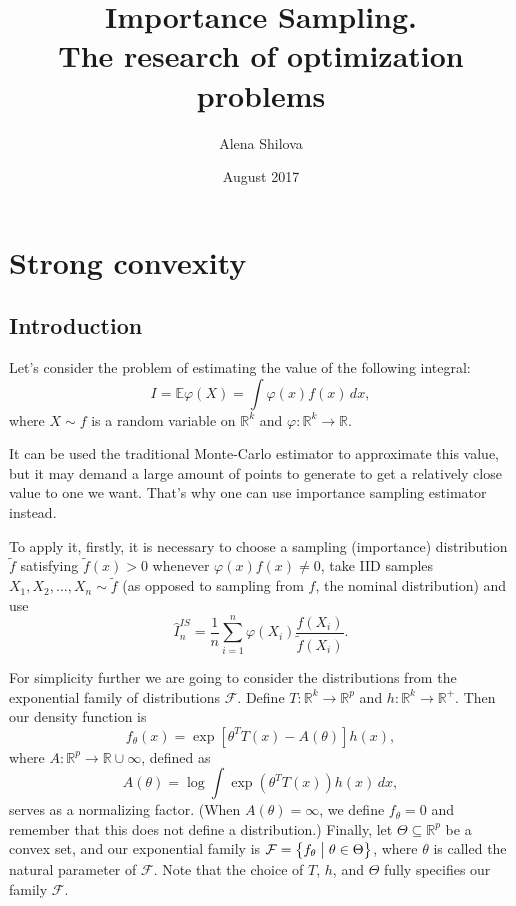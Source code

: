 \documentclass{article}
\title{Importance Sampling. \\
The research of optimization problems}
\author{Alena Shilova}
\date{August 2017}
\begin{document}
\maketitle

\section*{Strong convexity}

\subsection*{Introduction}

Let's consider the problem of estimating the value of the following integral:
\[
I = \mathbb{E}\varphi(X) =\int \varphi(x)f(x) \, dx,
\]
where $X \sim f$ is a random variable on $\mathbb{R}^k$ and $\varphi : \mathbb{R}^k \rightarrow \mathbb{R}$. 

It can be used the traditional Monte-Carlo estimator to approximate this value, but it may demand a large amount of points to generate to get a relatively close value to one we want. That's why one can use importance sampling estimator instead. 

To apply it, firstly, it is necessary to choose a sampling (importance) distribution $\tilde f$ satisfying $\tilde f(x) > 0$ whenever $ \varphi(x)f(x) \neq 0$, take IID samples $X_1,X_2, \dots,X_n \sim \tilde f$ (as opposed to sampling from $f$, the
nominal distribution) and use
\[
\hat I^{IS}_n = \frac 1n \sum^n_{i=1} \varphi(X_i) \frac{f(X_i)}{\tilde f(X_i)}.
\]

For simplicity further we are going to consider the distributions from the exponential family of distributions $\mathcal{F}$. Define $T : \mathbb{R}^k \rightarrow \mathbb{R}^p$ and $h : \mathbb{R}^k \rightarrow \mathbb{R}^+$. Then our density function is
\[
f_{\theta}(x) = \exp \left[\theta^T T(x) - A(\theta)\right] h(x),
\]
where $A : \mathbb{R}^p \rightarrow \mathbb{R} \cup {\infty}$, defined as
\[
A(\theta) = \log \int \exp(\theta^TT(x))h(x)\, dx,
\]
serves as a normalizing factor. (When $A(\theta) = \infty$, we define $f_{\theta} = 0$ and remember that this does not define a distribution.) Finally, let $\Theta \subseteq \mathbb{R}^p$ be a convex set, and our exponential family is $\mathcal{F} = \bigl\{f_{\theta} \bigm| \theta \in  \Theta\bigr\}$, where $\theta$ is called the natural parameter of $\mathcal{F}$. Note that the
choice of $T$, $h$, and $\Theta$ fully specifies our family $\mathcal{F}$. 
\end{document}
